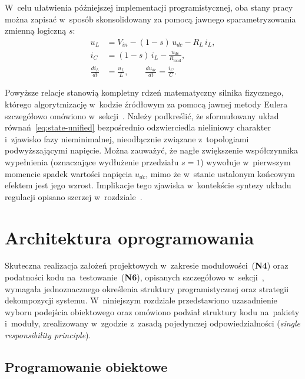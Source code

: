 W~celu ułatwienia późniejszej implementacji programistycznej, oba stany pracy można zapisać w~sposób skonsolidowany za pomocą jawnego sparametryzowania zmienną logiczną $s$:
\begin{equation}
    \begin{aligned}
        u_L &= V_{in} - (1-s)\,u_{dc} - R_L\,i_L, \\
        i_C &= (1-s)\,i_L - \frac{u_{dc}}{R_{\mathrm{load}}}, \\
        \frac{di_L}{dt} &= \frac{u_L}{L}, \qquad \frac{du_{dc}}{dt} = \frac{i_C}{C}.
    \end{aligned}
    \label{eq:state-unified}
\end{equation}

Powyższe relacje stanowią kompletny rdzeń matematyczny silnika fizycznego, którego algorytmizację w~kodzie źródłowym za pomocą jawnej metody Eulera szczegółowo omówiono w~sekcji~. Należy podkreślić, że sformułowany układ równań~\eqref{eq:state-unified} bezpośrednio odzwierciedla nieliniowy charakter i~zjawisko fazy nieminimalnej, nieodłącznie związane z~topologiami podwyższającymi napięcie. Można zauważyć, że nagłe zwiększenie współczynnika wypełnienia (oznaczające wydłużenie przedziału $s=1$) wywołuje w~pierwszym momencie spadek wartości napięcia $u_{dc}$, mimo że w~stanie ustalonym końcowym efektem jest jego wzrost. Implikacje tego zjawiska w~kontekście syntezy układu regulacji opisano szerzej w~rozdziale~.

\section{Architektura oprogramowania}
\label{sec:architektura}

Skuteczna realizacja założeń projektowych w~zakresie modułowości~(\textbf{N4}) oraz podatności kodu na~testowanie~(\textbf{N6}), opisanych szczegółowo w~sekcji~, wymagała jednoznacznego określenia struktury programistycznej oraz strategii dekompozycji systemu. W~niniejszym rozdziale przedstawiono uzasadnienie wyboru podejścia obiektowego oraz omówiono podział struktury kodu na~pakiety i~moduły, zrealizowany w~zgodzie z~zasadą pojedynczej odpowiedzialności (\emph{single responsibility principle}).

\subsection{Programowanie obiektowe}
\label{subsec:oop}

